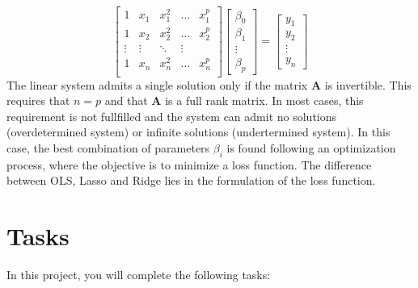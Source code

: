 \documentclass[11pt]{article}
\begin{document}
\begin{equation} \label{eq_lin_system}
	\begin{bmatrix}
		1 & x_1 & x^2_1 & \dots & x^p_1 \\
        1 & x_2 & x^2_2 & \dots & x^p_2 \\
        \vdots & \vdots & \ddots & \vdots \\
        1 & x_n & x^2_n & \dots & x^p_n \\
	\end{bmatrix}
    \begin{bmatrix}
    	\beta_0 \\
        \beta_1 \\
        \vdots \\
        \beta_p
    \end{bmatrix}
 = 
 \begin{bmatrix}
    	y_1 \\
        y_2 \\
        \vdots \\
        y_n
    \end{bmatrix}
\end{equation}The linear system admits a single solution only if the matrix $ \mathbf{A}$ is invertible. This requires that $n = p$ and that $\mathbf{A} $ is a full rank matrix. In most cases, this requirement is not fullfilled and the system can admit no solutions (overdetermined system) or infinite solutions (undertermined system). In this case, the best combination of parameters $\beta_i$ is found following an optimization process, where the objective is to minimize a loss function. The difference between OLS, Lasso and Ridge lies in the formulation of the loss function.  

\section*{Tasks}

In this project, you will complete the following tasks:
\end{document}
